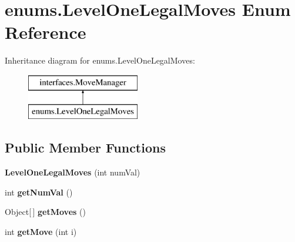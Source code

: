 \hypertarget{enumenums_1_1_level_one_legal_moves}{\section{enums.\-Level\-One\-Legal\-Moves Enum Reference}
\label{enumenums_1_1_level_one_legal_moves}
}
Inheritance diagram for enums.\-Level\-One\-Legal\-Moves\-:\begin{figure}[H]
\begin{center}
\leavevmode
\includegraphics[height=2.000000cm]{enumenums_1_1_level_one_legal_moves}
\end{center}
\end{figure}
\subsection*{Public Member Functions}
\begin{DoxyCompactItemize}
\item 
\hypertarget{enumenums_1_1_level_one_legal_moves_aded54a680535abc28017bfbe368b0aaa}{{\bfseries Level\-One\-Legal\-Moves} (int num\-Val)}\label{enumenums_1_1_level_one_legal_moves_aded54a680535abc28017bfbe368b0aaa}

\item 
\hypertarget{enumenums_1_1_level_one_legal_moves_accdb27e9bf9929f580c7638f7919c9f4}{int {\bfseries get\-Num\-Val} ()}\label{enumenums_1_1_level_one_legal_moves_accdb27e9bf9929f580c7638f7919c9f4}

\item 
\hypertarget{enumenums_1_1_level_one_legal_moves_a38273528563c42d4759fb7b2daf8f08f}{Object\mbox{[}$\,$\mbox{]} {\bfseries get\-Moves} ()}\label{enumenums_1_1_level_one_legal_moves_a38273528563c42d4759fb7b2daf8f08f}

\item 
\hypertarget{enumenums_1_1_level_one_legal_moves_a97203dc4cee8847151c3fc825c0f3e76}{int {\bfseries get\-Move} (int i)}\label{enumenums_1_1_level_one_legal_moves_a97203dc4cee8847151c3fc825c0f3e76}

\end{DoxyCompactItemize}
